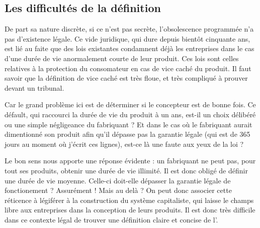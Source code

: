 \subsection{Les difficultés de la définition}

De part sa nature discrète, si ce n'est pas secrète, l'obsolescence programmée n'a pas d'existence légale. Ce vide juridique, qui dure depuis bientôt cinquante ans, est lié au faite que des lois existantes condamnent déjà les entreprises dans le cas d'une durée de vie anormalement courte de leur produit. Ces lois sont celles relatives à la protection du consomateur en cas de vice caché du produit. Il faut savoir que la définition de vice caché est très floue, et très compliqué à prouver devant un tribunal.

Car le grand problème ici est de déterminer si le concepteur est de bonne fois. Ce défault, qui raccourci la durée de vie du produit à un ans, est-il un choix délibéré ou une simple négligeance du fabriquant ? Et dans le cas où le fabriquant aurait dimentionné son produit afin qu'il dépasse pas la garantie légale (qui est de 365 jours au moment où j'écrit ces lignes), est-ce là une faute aux yeux de la loi ?

Le bon sens nous apporte une réponse évidente : un fabriquant ne peut pas, pour tout ses produits, obtenir une durée de vie illimité. Il est donc obligé de définir une durée de vie moyenne. Celle-ci doit-elle dépasser la garantie légale de fonctionement ? Assurément ! Mais au delà ?
\medbreak
On peut donc associer cette réticence à légiférer à la construction du système capitaliste, qui laisse le champs libre aux entreprises dans la conception de leurs produits. 
Il est donc très difficile dans ce contexte légal de trouver une définition claire et concise de l'\OP.
